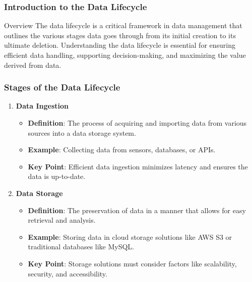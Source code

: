 \documentclass[aspectratio=169]{beamer}
\begin{document}
\frame{\titlepage}

\begin{frame}[fragile]
    \frametitle{Introduction to the Data Lifecycle}
    \begin{block}{Overview}
        The data lifecycle is a critical framework in data management that outlines the various stages data goes through from its initial creation to its ultimate deletion. Understanding the data lifecycle is essential for ensuring efficient data handling, supporting decision-making, and maximizing the value derived from data.
    \end{block}
\end{frame}

\begin{frame}[fragile]
    \frametitle{Stages of the Data Lifecycle}
    \begin{enumerate}
        \item \textbf{Data Ingestion}
            \begin{itemize}
                \item \textbf{Definition}: The process of acquiring and importing data from various sources into a data storage system.
                \item \textbf{Example}: Collecting data from sensors, databases, or APIs.
                \item \textbf{Key Point}: Efficient data ingestion minimizes latency and ensures the data is up-to-date.
            \end{itemize}
        \item \textbf{Data Storage}
            \begin{itemize}
                \item \textbf{Definition}: The preservation of data in a manner that allows for easy retrieval and analysis.
                \item \textbf{Example}: Storing data in cloud storage solutions like AWS S3 or traditional databases like MySQL.
                \item \textbf{Key Point}: Storage solutions must consider factors like scalability, security, and accessibility.
            \end{itemize}
    \end{enumerate}
\end{frame}
\end{document}
